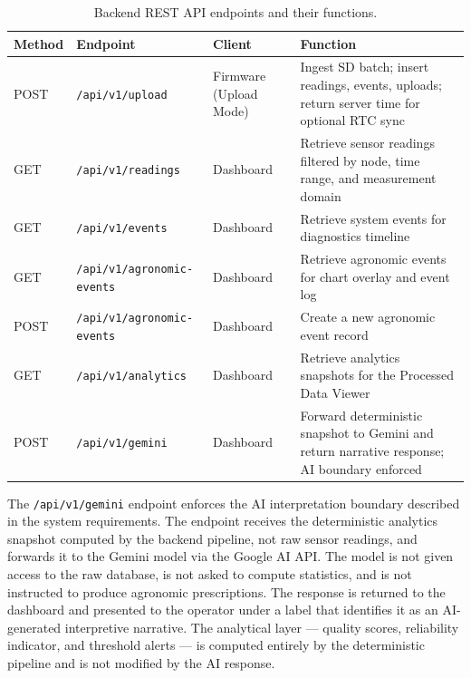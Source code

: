 \begin{table}[H]
\centering
\caption{Backend REST API endpoints and their functions.}
\label{tab:api-endpoints}
\small
\begin{tabular}{p{1.5cm} p{4.5cm} p{2.5cm} p{5.0cm}}
\hline
\textbf{Method} & \textbf{Endpoint} & \textbf{Client} & \textbf{Function} \\
\hline
POST & \texttt{/api/v1/upload} & Firmware (Upload Mode) & Ingest SD batch; insert readings, events, uploads; return server time for optional RTC sync \\
\hline
GET & \texttt{/api/v1/readings} & Dashboard & Retrieve sensor readings filtered by node, time range, and measurement domain \\
\hline
GET & \texttt{/api/v1/events} & Dashboard & Retrieve system events for diagnostics timeline \\
\hline
GET & \texttt{/api/v1/agronomic-events} & Dashboard & Retrieve agronomic events for chart overlay and event log \\
\hline
POST & \texttt{/api/v1/agronomic-events} & Dashboard & Create a new agronomic event record \\
\hline
GET & \texttt{/api/v1/analytics} & Dashboard & Retrieve analytics snapshots for the Processed Data Viewer \\
\hline
POST & \texttt{/api/v1/gemini} & Dashboard & Forward deterministic snapshot to Gemini and return narrative response; AI boundary enforced \\
\hline
\end{tabular}
\end{table}


The \texttt{/api/v1/gemini} endpoint enforces the AI interpretation boundary described in the system requirements. The endpoint receives the deterministic analytics snapshot computed by the backend pipeline, not raw sensor readings, and forwards it to the Gemini model via the Google AI API. The model is not given access to the raw database, is not asked to compute statistics, and is not instructed to produce agronomic prescriptions. The response is returned to the dashboard and presented to the operator under a label that identifies it as an AI-generated interpretive narrative. The analytical layer — quality scores, reliability indicator, and threshold alerts — is computed entirely by the deterministic pipeline and is not modified by the AI response.

